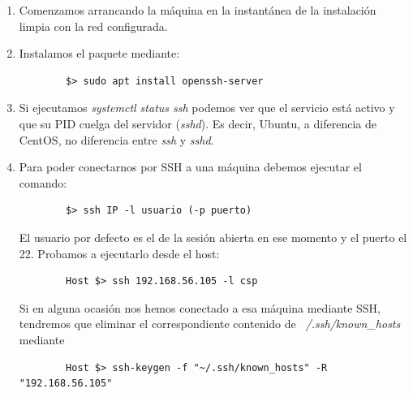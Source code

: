 \documentclass[12pt,spanish]{article}
\begin{document}
\begin{enumerate}
	\item Comenzamos arrancando la máquina en la instantánea de la instalación limpia con la red configurada.
	\item Instalamos el paquete mediante:
	\begin{lstlisting}
		$> sudo apt install openssh-server
	\end{lstlisting}
	\item Si ejecutamos \textit{systemctl status ssh} podemos ver que el servicio está activo y que su PID cuelga del servidor (\textit{sshd}). Es decir, Ubuntu, a diferencia de CentOS, no diferencia entre \textit{ssh} y \textit{sshd}.
	\item Para poder conectarnos por SSH a una máquina debemos ejecutar el comando:
	\begin{lstlisting}
		$> ssh IP -l usuario (-p puerto)
	\end{lstlisting}
	El usuario por defecto es el de la sesión abierta en ese momento y el puerto el 22.
	Probamos a ejecutarlo desde el host:
	\begin{lstlisting}
		Host $> ssh 192.168.56.105 -l csp
	\end{lstlisting}
	Si en alguna ocasión nos hemos conectado a esa máquina mediante SSH, tendremos que eliminar el correspondiente contenido de \textit{~/.ssh/known\_hosts} mediante
	\begin{lstlisting}
		Host $> ssh-keygen -f "~/.ssh/known_hosts" -R "192.168.56.105"
	\end{lstlisting}



\end{enumerate}
\end{document}
